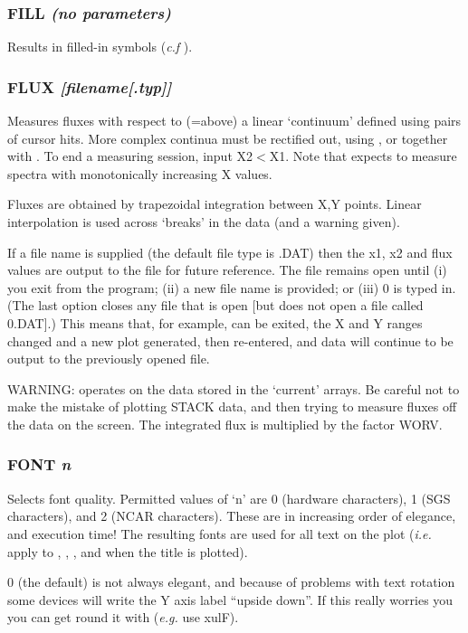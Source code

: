 \documentclass[twoside,11pt,noabs,nolof]{starlink}
\providecommand{\dipcom}[3]{\subsubsection*{\label{COM:#1}\xlabel{COM:#1}\textbf{#1} \emph{#2}}}
\begin{document}
\dipcom{FILL}{(no parameters)}{Causes symbols created by {\texttt{MARK}} to be filled in}
Results in filled-in   symbols (\textit{c.f} ).

\dipcom{FLUX}{[filename[.typ]] }{Measures fluxes with respect to a linear 'continuum'}
Measures fluxes with respect to (=above) a linear `continuum' defined
using pairs of cursor hits. More complex continua must be rectified
out, using ,  or   together with .  To end a   measuring
session, input X2$<$X1. Note that   expects to measure spectra with
monotonically increasing X values.

Fluxes are obtained by trapezoidal integration between X,Y points.
Linear interpolation is used across `breaks' in the data (and a
warning given).

If a file name is supplied (the default file type is .DAT) then the
x1, x2 and flux values are output to the file for future reference.
The file remains open until (i) you exit from the program; (ii) a new
file name is provided; or (iii)   0 is typed in. (The last option
closes any file that is open [but does not open a file called 0.DAT].)
This means that, for example,   can be exited, the X and Y ranges
changed and a new plot generated, then   re-entered, and data will
continue to be output to the previously opened file.

WARNING:   operates on the data stored in the `current' arrays. Be
careful not to make the mistake of plotting STACK data, and then
trying to measure fluxes off the data on the screen. The integrated
flux is multiplied by the factor WORV.

\dipcom{FONT}{n}{Selects font quality}
Selects font quality. Permitted values of `n' are 0 (hardware
characters), 1 (SGS characters), and 2 (NCAR characters). These are in
increasing order of elegance, and execution time! The resulting fonts
are used for all text on the plot (\emph{i.e.} apply to ,  ,
,  and   when the title is plotted).

  0 (the default) is not always elegant, and because of problems
with text rotation some devices will write the Y axis label ``upside
down''. If this really worries you you can get round it with 
(\emph{e.g.} use   xulF).
\end{document}
